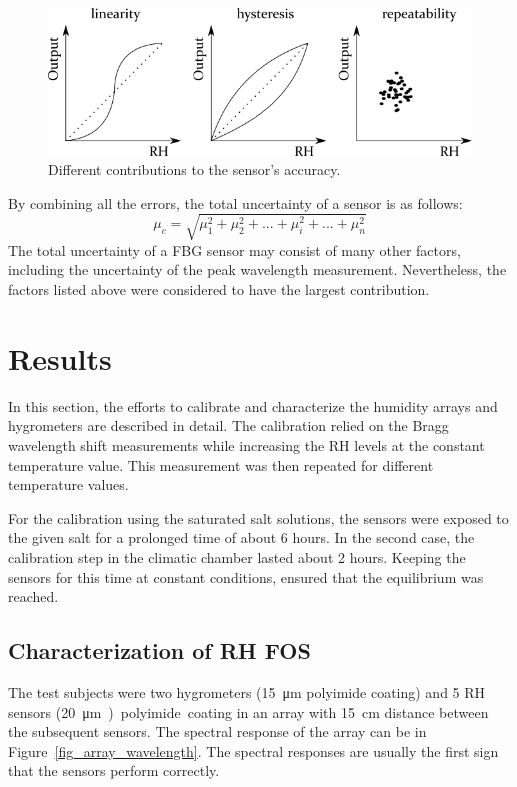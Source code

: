 \begin{figure}[!h]
\centering
\includegraphics[width=0.85\columnwidth]{Chapter5/images/Picture2.png}
\caption{Different contributions to the sensor's accuracy.}
\label{fig:accuracy}
\end{figure}
By combining all the errors, the total uncertainty of a sensor is as follows:
\begin{equation}
    \mu_{c} = \sqrt{\mu_{1}^{2} + \mu_{2}^{2} + ... + \mu_{i}^{2} + ... + \mu_{n}^{2}}
\end{equation}
The total uncertainty of a \gls{FBG} sensor may consist of many other factors, including the uncertainty of the peak wavelength measurement. Nevertheless, the factors listed above were considered to have the largest contribution. 

\section{Results}
\label{fbg_results}
In this section, the efforts to calibrate and characterize the humidity arrays and hygrometers are described in detail. The calibration relied on the Bragg wavelength shift measurements while increasing the \gls{RH} levels at the constant temperature value. This measurement was then repeated for different temperature values.

For the calibration using the saturated salt solutions, the sensors were exposed to the given salt for a prolonged time of about 6 hours. In the second case, the calibration step in the climatic chamber lasted about 2 hours. Keeping the sensors for this time at constant conditions, ensured that the equilibrium was reached. 
\subsection{Characterization of RH FOS}

The test subjects were two hygrometers (\SI{15}{\micro\metre} polyimide coating) and  5 \gls{RH} sensors (\SI{20}{\micro\metre) polyimide coating} in an array with \SI{15}{\cm} distance between the subsequent sensors. The spectral response of the array can be in Figure~\ref{fig_array_wavelength}. The spectral responses are usually the first sign that the sensors perform correctly. 


